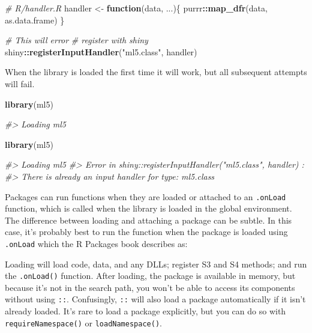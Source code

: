 \documentclass[10pt,]{krantz}
\makeatletter
\newenvironment{Shaded}{\begin{snugshade}}{\end{snugshade}}
\newcommand{\CommentTok}[1]{\textcolor[rgb]{0.37,0.37,0.37}{\textit{#1}}}
\newcommand{\ControlFlowTok}[1]{\textcolor[rgb]{0.27,0.27,0.27}{\textbf{#1}}}
\newcommand{\KeywordTok}[1]{\textcolor[rgb]{0.27,0.27,0.27}{\textbf{#1}}}
\newcommand{\NormalTok}[1]{#1}
\newcommand{\OperatorTok}[1]{\textcolor[rgb]{0.43,0.43,0.43}{\textbf{#1}}}
\newcommand{\StringTok}[1]{\textcolor[rgb]{0.5,0.5,0.5}{#1}}
\renewenvironment{quote}{\begin{VF}}{\end{VF}}
\newenvironment{kframe}{%
\medskip{}
\setlength{\fboxsep}{.8em}
 \def\at@end@of@kframe{}%
 \ifinner\ifhmode%
  \def\at@end@of@kframe{\end{minipage}}%
  \begin{minipage}{\columnwidth}%
 \fi\fi%
 \def\FrameCommand##1{\hskip\@totalleftmargin \hskip-\fboxsep
 \colorbox{shadecolor}{##1}\hskip-\fboxsep
     \hskip-\linewidth \hskip-\@totalleftmargin \hskip\columnwidth}%
 \MakeFramed {\advance\hsize-\width
   \@totalleftmargin\z@ \linewidth\hsize
   \@setminipage}}%
 {\par\unskip\endMakeFramed%
 \at@end@of@kframe}
\renewenvironment{Shaded}{\begin{kframe}}{\end{kframe}}
\makeatother
\begin{document}
\begin{Shaded}
\begin{Highlighting}[]
\CommentTok{# R/handler.R}
\NormalTok{handler <-}\StringTok{ }\ControlFlowTok{function}\NormalTok{(data, ...)\{}
\NormalTok{  purrr}\OperatorTok{::}\KeywordTok{map_dfr}\NormalTok{(data, as.data.frame)}
\NormalTok{\}}

\CommentTok{# This will error}
\CommentTok{# register with shiny}
\NormalTok{shiny}\OperatorTok{::}\KeywordTok{registerInputHandler}\NormalTok{(}\StringTok{"ml5.class"}\NormalTok{, handler)}
\end{Highlighting}
\end{Shaded}

When the library is loaded the first time it will work, but all subsequent attempts will fail.

\begin{Shaded}
\begin{Highlighting}[]
\KeywordTok{library}\NormalTok{(ml5)}

\CommentTok{#> Loading ml5}

\KeywordTok{library}\NormalTok{(ml5)}

\CommentTok{#> Loading ml5}
\CommentTok{#> Error in shiny::registerInputHandler("ml5.class", handler) : }
\CommentTok{#>   There is already an input handler for type: ml5.class}
\end{Highlighting}
\end{Shaded}

Packages can run functions when they are loaded or attached to an \texttt{.onLoad} function, which is called when the library is loaded in the global environment. The difference between loading and attaching a package can be subtle. In this case, it's probably best to run the function when the package is loaded using \texttt{.onLoad} which the R Packages book describes as:

\begin{quote}
Loading will load code, data, and any DLLs; register S3 and S4 methods; and run the \texttt{.onLoad()} function. After loading, the package is available in memory, but because it's not in the search path, you won't be able to access its components without using \texttt{::}. Confusingly, \texttt{::} will also load a package automatically if it isn't already loaded. It's rare to load a package explicitly, but you can do so with \texttt{requireNamespace()} or \texttt{loadNamespace()}.
\end{quote}
\end{document}

